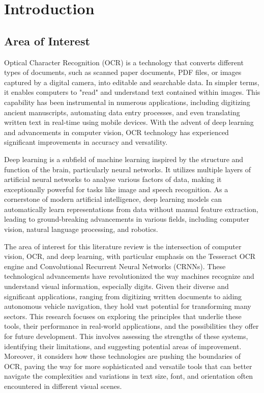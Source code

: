 \chapter{Introduction}
\label{chap:intro}


\section{Area of Interest}

Optical Character Recognition (OCR) is a technology that converts different types of documents, such as scanned paper documents, PDF files, or images captured by a digital camera, into editable and searchable data. In simpler terms, it enables computers to "read" and understand text contained within images. This capability has been instrumental in numerous applications, including digitizing ancient manuscripts, automating data entry processes, and even translating written text in real-time using mobile devices. With the advent of deep learning and advancements in computer vision, OCR technology has experienced significant improvements in accuracy and versatility.


Deep learning is a subfield of machine learning inspired by the structure and function of the brain, particularly neural networks. It utilizes multiple layers of artificial neural networks to analyse various factors of data, making it exceptionally powerful for tasks like image and speech recognition. As a cornerstone of modern artificial intelligence, deep learning models can automatically learn representations from data without manual feature extraction, leading to ground-breaking advancements in various fields, including computer vision, natural language processing, and robotics.

The area of interest for this literature review is the intersection of computer vision, OCR, and deep learning, with particular emphasis on the Tesseract OCR engine and Convolutional Recurrent Neural Networks (CRNNs). These technological advancements have revolutionized the way machines recognize and understand visual information, especially digits. Given their diverse and significant applications, ranging from digitizing written documents to aiding autonomous vehicle navigation, they hold vast potential for transforming many sectors. This research focuses on exploring the principles that underlie these tools, their performance in real-world applications, and the possibilities they offer for future development. This involves assessing the strengths of these systems, identifying their limitations, and suggesting potential areas of improvement. Moreover, it considers how these technologies are pushing the boundaries of OCR, paving the way for more sophisticated and versatile tools that can better navigate the complexities and variations in text size, font, and orientation often encountered in different visual scenes.

